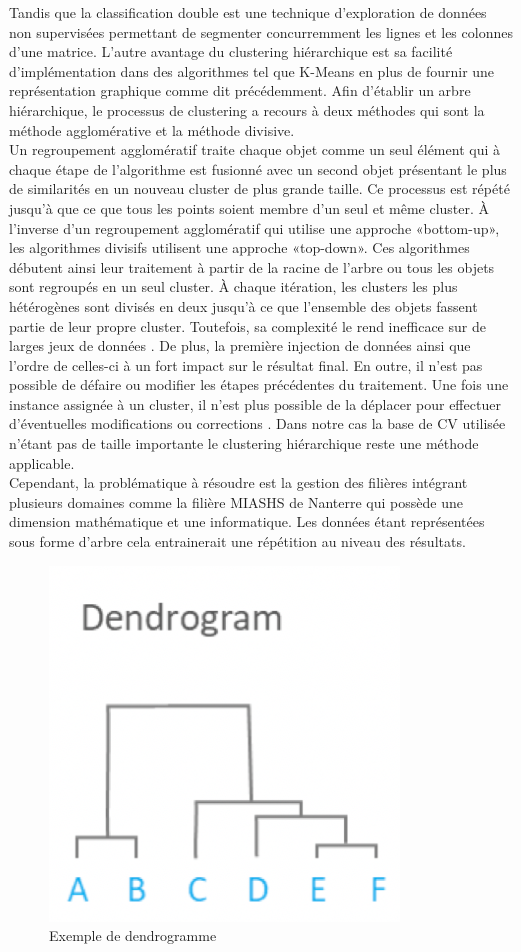 \documentclass[memoire.tex]{subfiles}
\begin{document}
 Tandis que la classification double est une technique d'exploration de données non supervisées permettant de segmenter concurremment les lignes et les colonnes d'une matrice. L'autre avantage du clustering hiérarchique est sa facilité d'implémentation dans des algorithmes tel que K-Means en plus de fournir une représentation graphique comme dit précédemment. Afin d'établir un arbre hiérarchique, le processus de clustering a recours à deux méthodes qui sont la méthode agglomérative et la méthode divisive.\\ Un regroupement agglomératif traite chaque objet comme un seul élément qui à chaque étape de l'algorithme est fusionné avec un second objet présentant le plus de similarités en un nouveau cluster de plus grande taille. Ce processus est répété jusqu'à que ce que tous les points soient membre d'un seul et même cluster. À l'inverse d'un regroupement agglomératif qui utilise une approche «bottom-up», les algorithmes divisifs utilisent une approche «top-down». Ces algorithmes débutent ainsi leur traitement à partir de la racine de l'arbre ou tous les objets sont regroupés en un seul cluster. À chaque itération, les clusters les plus hétérogènes sont divisés en deux jusqu'à ce que l'ensemble des objets fassent partie de leur propre cluster. Toutefois, sa complexité le rend inefficace sur de larges jeux de données \cite{ref7}. De plus, la première injection de données ainsi que l'ordre de celles-ci  à un fort impact sur le résultat final. En outre, il n'est pas possible de défaire ou modifier les étapes précédentes du traitement. Une fois une instance assignée à un cluster, il n'est plus possible de la déplacer pour effectuer d'éventuelles modifications ou corrections \cite{ref5}. Dans notre cas la base de CV utilisée n'étant pas de taille importante le clustering hiérarchique reste une méthode applicable. \\Cependant, la problématique à résoudre est la gestion des filières intégrant plusieurs domaines comme la filière MIASHS de Nanterre qui possède une dimension mathématique et une informatique. Les données étant représentées sous forme d'arbre cela entrainerait une répétition au niveau des résultats.
	\begin{figure}[h!]
		\centerline{\includegraphics[scale=0.8]{img/hierarchical_clustering.png}}
		\caption{Exemple de dendrogramme}
	\end{figure}
	
\end{document}
